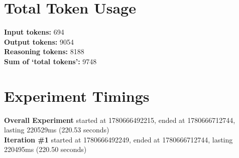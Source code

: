 \documentclass{article}
\begin{document}
\section*{Total Token Usage}
\textbf{Input tokens: }694
\\\textbf{Output tokens: }9054
\\\textbf{Reasoning tokens: }8188
\\\textbf{Sum of `total tokens': }9748
\section*{Experiment Timings}
\textbf{Overall Experiment} started at 1780666492215, ended at 1780666712744, lasting 220529ms (220.53 seconds)
\\\textbf{Iteration \#1} started at 1780666492249, ended at 1780666712744, lasting 220495ms (220.50 seconds)
\end{document}
